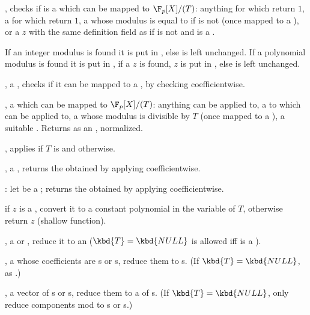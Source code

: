 , checks if  is a 
which can be mapped to $\F_p[X]/(T)$: anything for which  return
$1$, a  for which  return $1$, a 
whose modulus is equal to  if  is not  (once mapped
to a ), or a  $z$ with the same definition field as 
if  is not  and is a .

If an integer modulus is found it is put in , else  is left
unchanged. If a polynomial modulus is found it is put in ,
if a  $z$ is found, $z$ is put in , else
 is left unchanged.

,  a ,
checks if it can be mapped to a , by checking 
coefficientwise.

,  a  which can be
mapped to $\F_p[X]/(T)$: anything  can be applied to,
a  to which  can be applied to, a 
whose modulus is divisible by $T$ (once mapped to a ), a suitable
. Returns  as an , normalized.

, applies  if $T$
is  and  otherwise.

,  a , returns the
 obtained by applying  coefficientwise.

: let  be a ;
returns the  obtained by applying  coefficientwise.

if $z$ is a , convert it to a constant polynomial in the variable of
$T$, otherwise return $z$ (shallow function).

,  a  or ,
reduce it to an  ($\kbd{T} = \kbd{NULL}$ is allowed iff  is a
).

,  a 
whose coefficients are s or s, reduce them to s. (If
$\kbd{T} = \kbd{NULL}$, as .)

,  a vector of s or
s, reduce them to a  of s. (If $\kbd{T} = \kbd{NULL}$, only
reduce components mod  to s or s.)

